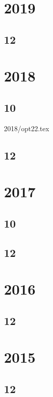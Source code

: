 \documentclass[11pt]{book}
\begin{document}
\section{2019}
\subsection{12}




\section{2018}
\subsection{10}
 {2018/opt22.tex}
\subsection{12}




\section{2017}
\subsection{10}

\subsection{12}





\section{2016}
\subsection{12}


\section{2015}
\subsection{12}

\end{document}

